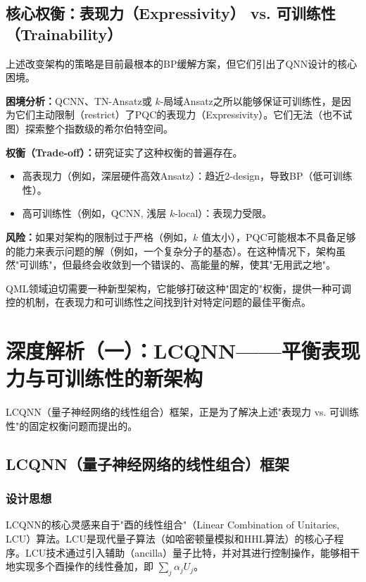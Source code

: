 \documentclass[12pt,a4paper]{article}
\begin{document}
\subsection{核心权衡：表现力（Expressivity） vs. 可训练性（Trainability）}

上述改变架构的策略是目前最根本的BP缓解方案，但它们引出了QNN设计的核心困境。

\textbf{困境分析：}QCNN、TN-Ansatz或 $k$-局域Ansatz之所以能够保证可训练性，是因为它们主动限制（restrict）了PQC的表现力（Expressivity）。它们无法（也不试图）探索整个指数级的希尔伯特空间。

\textbf{权衡（Trade-off）：}研究证实了这种权衡的普遍存在。
\begin{itemize}
\item 高表现力（例如，深层硬件高效Ansatz）：趋近2-design，导致BP（低可训练性）。
\item 高可训练性（例如，QCNN, 浅层 $k$-local）：表现力受限。
\end{itemize}

\textbf{风险：}如果对架构的限制过于严格（例如，$k$ 值太小），PQC可能根本不具备足够的能力来表示问题的解（例如，一个复杂分子的基态）。在这种情况下，架构虽然"可训练"，但最终会收敛到一个错误的、高能量的解，使其"无用武之地"。

QML领域迫切需要一种新型架构，它能够打破这种"固定的"权衡，提供一种可调控的机制，在表现力和可训练性之间找到针对特定问题的最佳平衡点。

\section{深度解析（一）：LCQNN——平衡表现力与可训练性的新架构}

LCQNN（量子神经网络的线性组合）框架，正是为了解决上述"表现力 vs. 可训练性"的固定权衡问题而提出的。

\subsection{LCQNN（量子神经网络的线性组合）框架}

\subsubsection{设计思想}

LCQNN的核心灵感来自于"酉的线性组合"（Linear Combination of Unitaries, LCU）算法。LCU是现代量子算法（如哈密顿量模拟和HHL算法）的核心子程序。LCU技术通过引入辅助（ancilla）量子比特，并对其进行控制操作，能够相干地实现多个酉操作的线性叠加，即 $\sum_j \alpha_j U_j$。
\end{document}
